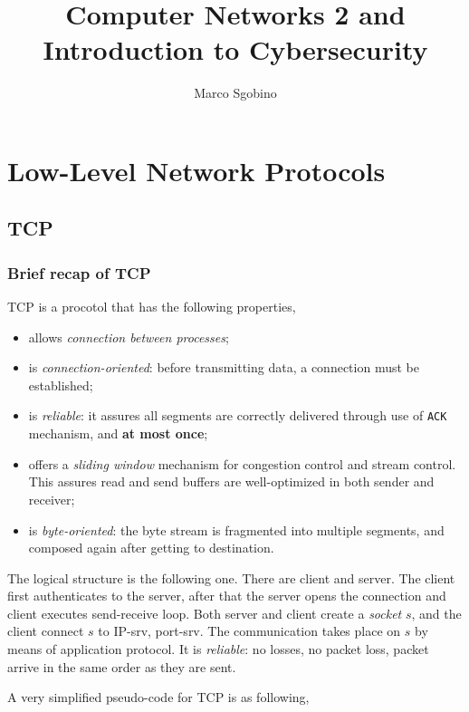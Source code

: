 \documentclass[a4paper, 11pt]{report}
\begin{document}
\title{Computer Networks 2 and Introduction to Cybersecurity}
\author{Marco Sgobino}
\maketitle
\tableofcontents

\part{Low-Level Network Protocols}

\chapter{TCP}

\section{Brief recap of TCP}
TCP is a procotol that has the following properties,

\begin{itemize}
	\item allows \emph{connection between processes};
	\item is \emph{connection-oriented}: before transmitting data, a
		connection must be established;
	\item is \emph{reliable}: it assures all segments are correctly
		delivered through use of \texttt{ACK} mechanism, and \textbf{at
		most once};
	\item offers a \emph{sliding window} mechanism for congestion control
		and stream control. This assures read and send buffers are
		well-optimized in both sender and receiver;
	\item is \emph{byte-oriented}: the byte stream is fragmented into
		multiple segments, and composed again after getting to
		destination.
\end{itemize}

The logical structure is the following one. There are client and server. The
client first authenticates to the server, after that the server opens the
connection and client executes send-receive loop. Both server and client create
a \emph{socket} $s$, and the client connect $s$ to IP-srv, port-srv. The
communication takes place on $s$ by means of application protocol. It is
\emph{reliable}: no losses, no packet loss, packet arrive in the same order as
they are sent.

A very simplified pseudo-code for TCP is as following,
\end{document}
